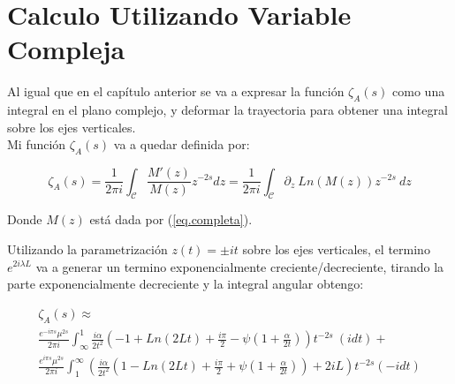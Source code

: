 \section{Calculo Utilizando Variable Compleja}


Al igual que en el capítulo anterior se va a expresar la función $\zeta _A (s)$ como una integral en el plano complejo, y deformar la trayectoria para obtener una integral sobre los ejes verticales. \\

Mi función $ \zeta _A (s) $ va a quedar definida por:

\begin{equation}
\zeta _A (s) = 
\frac{1}{2 \pi i} 
\int _{\mathcal{C}}
\frac{M ' ( z ) }{ M ( z ) } z ^{-2s} d z = 
\frac{1}{2 \pi i} 
\int _{\mathcal{C}}
\partial _z \ Ln (	M(z) ) z ^{-2s} \ dz
\label{eq.zeta.compleja}
\end{equation}

Donde $M ( z )$ está dada por (\ref{eq.completa}).

Utilizando la parametrización $ z (t) = \pm i t$ sobre los ejes verticales, el termino $e ^{2 i \lambda L}$ va a generar un termino exponencialmente creciente/decreciente, tirando la parte exponencialmente decreciente y la integral angular obtengo:

\begin{comment}

\begin{equation}
\begin{array}{c}
    \zeta _A (s) = \\
     \frac{1}{2 \pi i} \int _{\infty} ^{1}
     \frac{ i \alpha }{2 t^2} 
     \left(
      1 + \frac{i \pi}{2} + Ln[2 t] + \psi (1 + \frac{\beta}{2 t})
     \right)
     t ^{-2s}
     e ^{- i \pi s} (i dt) + \\
     \frac{1}{2 \pi i} \int _{\infty} ^{1} 
     \left(
     2 + \frac{\beta}{2 t^2}
     \left(
     1 + \frac{i \pi}{2} - Ln[2 t] - \psi (1+ \frac{\beta}{2 t})
     \right)
     t ^{-2s}
     e ^{ i \pi s} (-i dt)
     \right)     
\end{array}
\end{equation}

\end{comment}

\begin{equation}
\begin{array}{c}
    \zeta _A (s) \approx \\
     \frac{e^{-i \pi s} \mu ^{2s}}{2 \pi i} \int _{\infty} ^{1}
     \frac{ i \alpha}{2 t^2}
     \left(
     - 1 + Ln(2 L t) + \frac{i \pi}{2}  - \psi (1+\frac{\alpha}{2 t})
     \right)
     t^{-2 s}
      \ 
     (i dt) + \\
     \frac{e^{i \pi s} \mu ^{2s}}{2 \pi i} \int _1 ^{\infty}
	\left(      
     \frac{ i \alpha}{2  t^2}
     \left(
     1 - Ln(2 L t) + \frac{i \pi}{2} + \psi (1 + \frac{\alpha}{2 t}) 
      
     \right)
     + 2 i L
     \right)
     t^{-2 s}
     (-i dt)
     
\end{array}
\end{equation}

